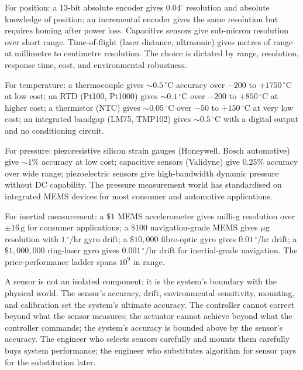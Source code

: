 For position: a $13$-bit absolute encoder gives $0.04^\circ$ resolution and absolute knowledge of position; an incremental encoder gives the same resolution but requires homing after power loss. Capacitive sensors give sub-micron resolution over short range. Time-of-flight (laser distance, ultrasonic) gives metres of range at millimetre to centimetre resolution. The choice is dictated by range, resolution, response time, cost, and environmental robustness.

For temperature: a thermocouple gives $\sim 0.5\,^\circ\text{C}$ accuracy over $-200$ to $+1750\,^\circ\text{C}$ at low cost; an RTD (Pt100, Pt1000) gives $\sim 0.1\,^\circ\text{C}$ over $-200$ to $+850\,^\circ\text{C}$ at higher cost; a thermistor (NTC) gives $\sim 0.05\,^\circ\text{C}$ over $-50$ to $+150\,^\circ\text{C}$ at very low cost; an integrated bandgap (LM75, TMP102) gives $\sim 0.5\,^\circ\text{C}$ with a digital output and no conditioning circuit.

For pressure: piezoresistive silicon strain gauges (Honeywell, Bosch automotive) give $\sim 1\%$ accuracy at low cost; capacitive sensors (Validyne) give $0.25\%$ accuracy over wide range; piezoelectric sensors give high-bandwidth dynamic pressure without DC capability. The pressure measurement world has standardised on integrated MEMS devices for most consumer and automotive applications.

For inertial measurement: a $\$1$ MEMS accelerometer gives milli-g resolution over $\pm 16\,\text{g}$ for consumer applications; a $\$100$ navigation-grade MEMS gives $\mu\text{g}$ resolution with $1\,^\circ/\text{hr}$ gyro drift; a $\$10{,}000$ fibre-optic gyro gives $0.01\,^\circ/\text{hr}$ drift; a $\$1{,}000{,}000$ ring-laser gyro gives $0.001\,^\circ/\text{hr}$ drift for inertial-grade navigation. The price-performance ladder spans $10^9$ in range.

\begin{archetype}
A sensor is not an isolated component; it is the system's boundary with the physical world. The sensor's accuracy, drift, environmental sensitivity, mounting, and calibration set the system's ultimate accuracy. The controller cannot correct beyond what the sensor measures; the actuator cannot achieve beyond what the controller commands; the system's accuracy is bounded above by the sensor's accuracy. The engineer who selects sensors carefully and mounts them carefully buys system performance; the engineer who substitutes algorithm for sensor pays for the substitution later.
\end{archetype}

